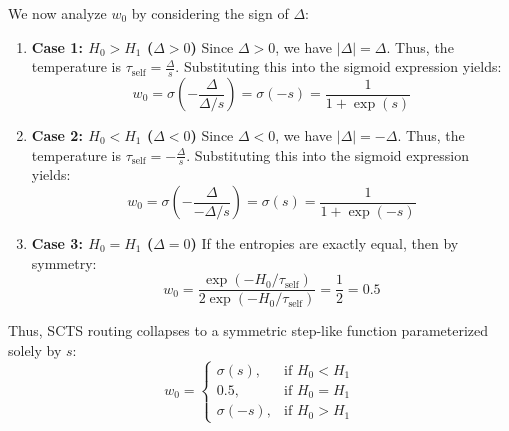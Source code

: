 \documentclass{article}
\theoremstyle{plain}
\theoremstyle{definition}
\theoremstyle{remark}
\begin{document}
We now analyze $w_0$ by considering the sign of $\Delta$:
\begin{enumerate}
    \item \textbf{Case 1: $H_0 > H_1$ ($\Delta > 0$)}
    Since $\Delta > 0$, we have $|\Delta| = \Delta$. Thus, the temperature is $\tau_{\text{self}} = \frac{\Delta}{s}$. Substituting this into the sigmoid expression yields:
    \begin{equation}
        w_0 = \sigma\left( -\frac{\Delta}{\Delta / s} \right) = \sigma(-s) = \frac{1}{1 + \exp(s)}
    \end{equation}
    
    \item \textbf{Case 2: $H_0 < H_1$ ($\Delta < 0$)}
    Since $\Delta < 0$, we have $|\Delta| = -\Delta$. Thus, the temperature is $\tau_{\text{self}} = -\frac{\Delta}{s}$. Substituting this into the sigmoid expression yields:
    \begin{equation}
        w_0 = \sigma\left( -\frac{\Delta}{-\Delta / s} \right) = \sigma(s) = \frac{1}{1 + \exp(-s)}
    \end{equation}
    
    \item \textbf{Case 3: $H_0 = H_1$ ($\Delta = 0$)}
    If the entropies are exactly equal, then by symmetry:
    \begin{equation}
        w_0 = \frac{\exp(-H_0 / \tau_{\text{self}})}{2 \exp(-H_0 / \tau_{\text{self}})} = \frac{1}{2} = 0.5
    \end{equation}
\end{enumerate}

Thus, SCTS routing collapses to a symmetric step-like function parameterized solely by $s$:
\begin{equation}
    w_0 = \begin{cases}
        \sigma(s), & \text{if } H_0 < H_1 \\
        0.5, & \text{if } H_0 = H_1 \\
        \sigma(-s), & \text{if } H_0 > H_1
    \end{cases}
\end{equation}
\end{document}
